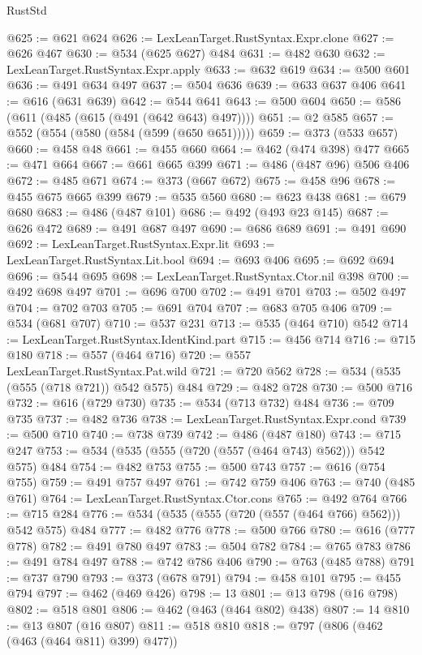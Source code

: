 \begin{lexlean}{RustStd}
\begin{coremodule}
@625 := @621 @624
@626 := LexLeanTarget.RustSyntax.Expr.clone
@627 := @626 @467
@630 := @534 (@625 @627) @484
@631 := @482 @630
@632 := LexLeanTarget.RustSyntax.Expr.apply
@633 := @632 @619
@634 := @500 @601
@636 := @491 @634 @497
@637 := @504 @636
@639 := @633 @637 @406
@641 := @616 (@631 @639)
@642 := @544 @641
@643 := @500 @604
@650 := @586 (@611 (@485 (@615 (@491 (@642 @643) @497))))
@651 := @2 @585
@657 := @552 (@554 (@580 (@584 (@599 (@650 @651)))))
@659 := @373 (@533 @657)
@660 := @458 @48
@661 := @455 @660
@664 := @462 (@474 @398) @477
@665 := @471 @664
@667 := @661 @665 @399
@671 := @486 (@487 @96) @506 @406
@672 := @485 @671
@674 := @373 (@667 @672)
@675 := @458 @96
@678 := @455 @675 @665 @399
@679 := @535 @560
@680 := @623 @438
@681 := @679 @680
@683 := @486 (@487 @101)
@686 := @492 (@493 @23 @145)
@687 := @626 @472
@689 := @491 @687 @497
@690 := @686 @689
@691 := @491 @690
@692 := LexLeanTarget.RustSyntax.Expr.lit
@693 := LexLeanTarget.RustSyntax.Lit.bool
@694 := @693 @406
@695 := @692 @694
@696 := @544 @695
@698 := LexLeanTarget.RustSyntax.Ctor.nil @398
@700 := @492 @698 @497
@701 := @696 @700
@702 := @491 @701
@703 := @502 @497
@704 := @702 @703
@705 := @691 @704
@707 := @683 @705 @406
@709 := @534 (@681 @707)
@710 := @537 @231
@713 := @535 (@464 @710) @542
@714 := LexLeanTarget.RustSyntax.IdentKind.part
@715 := @456 @714
@716 := @715 @180
@718 := @557 (@464 @716)
@720 := @557 LexLeanTarget.RustSyntax.Pat.wild
@721 := @720 @562
@728 := @534 (@535 (@555 (@718 @721)) @542 @575) @484
@729 := @482 @728
@730 := @500 @716
@732 := @616 (@729 @730)
@735 := @534 (@713 @732) @484
@736 := @709 @735
@737 := @482 @736
@738 := LexLeanTarget.RustSyntax.Expr.cond
@739 := @500 @710
@740 := @738 @739
@742 := @486 (@487 @180)
@743 := @715 @247
@753 := @534 (@535 (@555 (@720 (@557 (@464 @743) @562))) @542 @575) @484
@754 := @482 @753
@755 := @500 @743
@757 := @616 (@754 @755)
@759 := @491 @757 @497
@761 := @742 @759 @406
@763 := @740 (@485 @761)
@764 := LexLeanTarget.RustSyntax.Ctor.cons
@765 := @492 @764
@766 := @715 @284
@776 := @534 (@535 (@555 (@720 (@557 (@464 @766) @562))) @542 @575) @484
@777 := @482 @776
@778 := @500 @766
@780 := @616 (@777 @778)
@782 := @491 @780 @497
@783 := @504 @782
@784 := @765 @783
@786 := @491 @784 @497
@788 := @742 @786 @406
@790 := @763 (@485 @788)
@791 := @737 @790
@793 := @373 (@678 @791)
@794 := @458 @101
@795 := @455 @794
@797 := @462 (@469 @426)
@798 := 13
@801 := @13 @798 (@16 @798)
@802 := @518 @801
@806 := @462 (@463 (@464 @802) @438)
@807 := 14
@810 := @13 @807 (@16 @807)
@811 := @518 @810
@818 := @797 (@806 (@462 (@463 (@464 @811) @399) @477))

\end{coremodule}
\end{lexlean}
